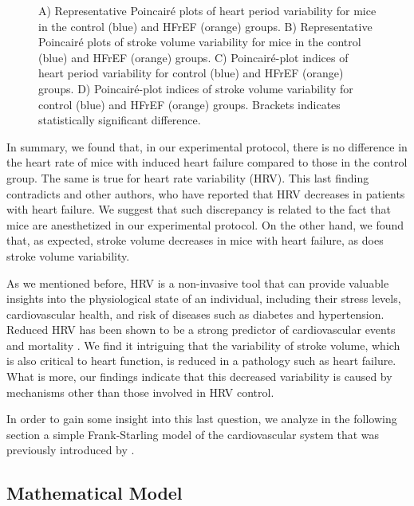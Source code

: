 \documentclass[%
preprint,
 amsmath,amssymb,
 aps,
]{revtex4-2}
\begin{document}
\begin{figure}[h!]
\begin{tabular}{cc}
    \end{tabular}
    \caption{A) Representative Poincairé plots of heart period variability for mice in the control (blue) and HFrEF (orange) groups. B) Representative Poincairé plots of stroke volume variability for mice in the control (blue) and HFrEF (orange) groups. C) Poincairé-plot indices of heart period variability for control (blue) and HFrEF (orange) groups. D) Poincairé-plot indices of stroke volume variability for control (blue) and HFrEF (orange) groups. Brackets indicates statistically significant difference.}
    \label{fig:fig02}
\end{figure}


In summary, we found that, in our experimental protocol, there is no difference in the heart rate of mice with induced heart failure compared to those in the control group. The same is true for heart rate variability (HRV). This last finding contradicts \citet{Kamen_1995} and other authors, who have reported that HRV decreases in patients with heart failure. We suggest that such discrepancy is related to the fact that mice are anesthetized in our experimental protocol. On the other hand, we found that, as expected, stroke volume decreases in mice with heart failure, as does stroke volume variability. 

As we mentioned before, HRV is a non-invasive tool that can provide valuable insights into the physiological state of an individual, including their stress levels, cardiovascular health, and risk of diseases such as diabetes and hypertension. Reduced HRV has been shown to be a strong predictor of cardiovascular events and mortality \citep{Zeki_Al_Hazzouri_2014}. We find it intriguing that the variability of stroke volume, which is also critical to heart function, is reduced in a pathology such as heart failure. What is more, our findings indicate that this decreased variability is caused by mechanisms other than those involved in HRV control. 

In order to gain some insight into this last question, we analyze in the following section a simple Frank-Starling model of the cardiovascular system that was previously introduced by \citet{Upton_2005}.

\subsection{Mathematical Model}
\end{document}
